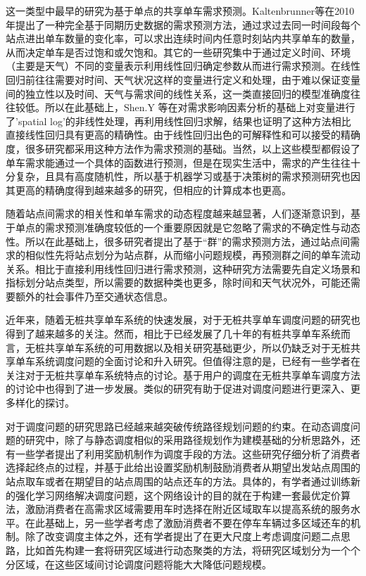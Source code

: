 \documentclass[]{tongjithesis}
\numberwithin{equation}{chapter}
\begin{document}
这一类型中最早的研究为基于单点的共享单车需求预测。Kaltenbrunner等在2010年提出了一种完全基于同期历史数据的需求预测方法\cite{kaltenbrunner2010urban}，通过求过去同一时间段每个站点进出单车数量的变化率，可以求出连续时间内任意时刻站内共享单车的数量，从而决定单车是否过饱和或欠饱和。其它的一些研究集中于通过定义时间、环境（主要是天气）不同的变量表示利用线性回归确定参数从而进行需求预测。在线性回归前往往需要对时间、天气状况这样的变量进行定义和处理，由于难以保证变量间的独立性以及时间、天气与需求间的线性关系，这一类直接回归的模型准确度往往较低。所以在此基础上，Shen.Y 等在对需求影响因素分析的基础上对变量进行了’spatial log’的非线性处理，再利用线性回归求解，结果也证明了这种方法相比直接线性回归具有更高的精确性\cite{shen2018understanding}。由于线性回归出色的可解释性和可以接受的精确度，很多研究都采用这种方法作为需求预测的基础。当然，以上这些模型都假设了单车需求能通过一个具体的函数进行预测，但是在现实生活中，需求的产生往往十分复杂，且具有高度随机性，所以基于机器学习\cite{xu2020hybrid}或基于决策树\cite{ve2020rule}的需求预测研究也因其更高的精确度得到越来越多的研究，但相应的计算成本也更高。

随着站点间需求的相关性和单车需求的动态程度越来越显著，人们逐渐意识到，基于单点的需求预测准确度较低的一个重要原因就是它忽略了需求的不确定性与动态性。所以在此基础上，很多研究者提出了基于“群”的需求预测方法\cite{chen2016dynamic,hulot2018towards}，通过站点间需求的相似性先将站点划分为站点群，从而缩小问题规模，再预测群之间的单车流动关系。相比于直接利用线性回归进行需求预测，这种研究方法需要先自定义场景和指标划分站点类型，所以需要的数据种类也更多，除时间和天气状况外，可能还需要额外的社会事件乃至交通状态信息。

近年来，随着无桩共享单车系统的快速发展，对于无桩共享单车调度问题的研究也得到了越来越多的关注。然而，相比于已经发展了几十年的有桩共享单车系统而言，无桩共享单车系统的可用数据以及相关研究基础更少，所以仍缺乏对于无桩共享单车系统调度问题的全面讨论和升入研究。但值得注意的是，已经有一些学者在关注对于无桩共享单车系统特点的讨论\cite{shen2018understanding,li2019operating,xing2020exploring}。基于用户的调度在无桩共享单车调度方法的讨论中也得到了进一步发展。类似的研究有助于促进对调度问题进行更深入、更多样化的探讨。

对于调度问题的研究思路已经越来越突破传统路径规划问题的约束。在动态调度问题的研究中，除了与静态调度相似的采用路径规划作为建模基础的分析思路外，还有一些学者提出了利用奖励机制作为调度手段的方法\cite{fricker2016incentives,ghosh2017incentivizing}。这些研究仔细分析了消费者选择起终点的过程，并基于此给出设置奖励机制鼓励消费者从期望出发站点周围的站点取车或者在期望目的站点周围的站点还车的方法。具体的，有学者通过训练新的强化学习网络解决调度问题，这个网络设计的目的就在于构建一套最优定价算法，激励消费者在高需求区域需要用车时选择在附近区域取车以提高系统的服务水平\cite{pan2019deep}。在此基础上，另一些学者考虑了激励消费者不要在停车车辆过多区域还车的机制\cite{duan2019optimizing,ji2020does}。除了改变调度主体之外，还有学者提出了在更大尺度上考虑调度问题二点思路，比如首先构建一套将研究区域进行动态聚类的方法，将研究区域划分为一个个分区域，在这些区域间讨论调度问题将能大大降低问题规模\cite{caggiani2017dynamic}。
\end{document}

